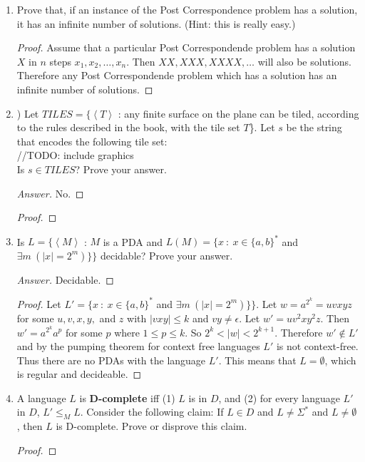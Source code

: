 \documentclass[10pt]{article}
\newcommand{\card}[1]{\left| #1 \right|}
\newcommand{\brackets}[1]{\left< #1 \right>}
\begin{document}
\begin{enumerate}[1)]

\item
Prove that, if an instance of the Post Correspondence problem has a solution, it has an infinite number of solutions. (Hint: this is really easy.)
\begin{proof}[Proof]
Assume that a particular Post Correspondende problem has a solution $X$ in $n$ steps $x_1, x_2, \dots , x_n$.  Then $XX, XXX, XXXX, \dots$ will also be solutions.  Therefore any Post Correspondende problem which has a solution has an infinite number of solutions.
\end{proof}


\item
) Let $TILES = \{\brackets{T}$ : any finite surface on the plane can be tiled, according to the rules described in the book, with the tile set $T$\}.  Let $s$ be the string that encodes the following tile set:\\

//TODO: include graphics\\

Is $s \in TILES$?  Prove your answer.
\begin{proof}[Answer]
No.
\end{proof}
\begin{proof}[Proof]
\end{proof}


\item
Is $L = \{\brackets{M}$ : $M$ is a PDA and $L(M) = \{x\ :\ x \in \{a, b\}^*$ and $\exists m\ (\card{x} = 2^m)\}\}$ decidable?  Prove your answer.
\begin{proof}[Answer]
Decidable.
\end{proof}
\begin{proof}[Proof]
Let $L' = \{x\ :\ x \in \{a, b\}^*$ and $\exists m\ (\card{x} = 2^m)\}\}$.  Let $w = a^{2^k} = uvxyz$ for some $u, v, x, y,$ and $z$ with $\card{vxy} \leq k$ and $vy \neq \epsilon$.  Let $w' = uv^2xy^2z$.  Then $w' = a^{2^k}a^p$ for some $p$ where $1 \leq p \leq k$.  So $2^k < \card{w} < 2^{k+1}$.  Therefore $w' \not \in L'$ and by the pumping theorem for context free languages $L'$ is not context-free.  Thus there are no PDAs with the language $L'$.  This means that $L = \emptyset$, which is regular and decideable.
\end{proof}


\item
A language $L$ is \textbf{D-complete} iff (1)  $L$ is in $D$, and (2) for every language  $L'$ in $D$,  $L' \leq _M L$.  Consider the following claim: If $L \in D$ and $L \neq \Sigma ^*$ and $L \neq \emptyset$, then $L$ is D-complete.  Prove or disprove this claim.
\begin{proof}[Proof]
\end{proof}


\end{enumerate}
\end{document}
